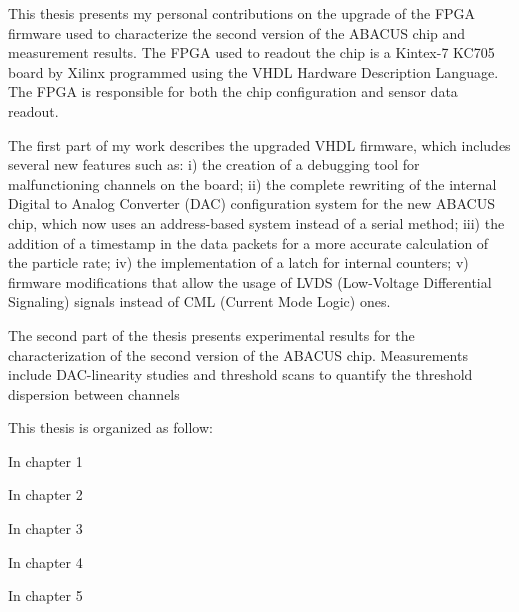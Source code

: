 This thesis presents my personal contributions on the upgrade of the FPGA firmware used to characterize
the second version of the ABACUS chip and measurement results.
The FPGA used to readout the chip is a Kintex-7 KC705 board by Xilinx programmed using the VHDL Hardware Description Language. The FPGA
is responsible for both the chip configuration and sensor data readout.

\noindent The first part of my work describes the upgraded VHDL firmware, which includes several new features such as:
i) the creation of a debugging tool for malfunctioning channels on the board;
ii) the complete rewriting of the internal Digital to Analog Converter (DAC) configuration system for the new ABACUS chip, which
now uses an address-based system instead of a serial method;
iii) the addition of a timestamp in the data packets for a more accurate calculation of the particle rate;
iv) the implementation of a latch for internal counters;
v) firmware modifications that allow the usage of LVDS (Low-Voltage Differential Signaling) signals instead of CML (Current Mode Logic) ones.

The second part of the thesis presents experimental results for the characterization of the second version of the ABACUS chip.
Measurements include DAC-linearity studies and threshold scans to quantify the threshold dispersion between channels

This thesis is organized as follow:

In chapter 1

In chapter 2

In chapter 3

In chapter 4

In chapter 5
